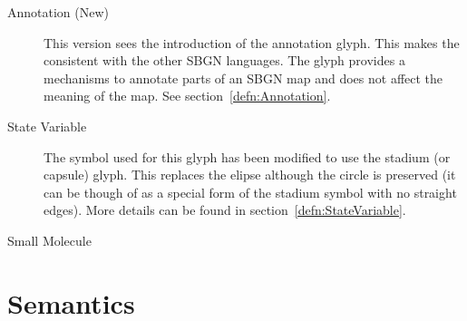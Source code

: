 \begin{description}
\item[Annotation (New)] This version sees the introduction of the annotation glyph. This makes the \PDl consistent with the other SBGN languages. The glyph provides a mechanisms to annotate parts of an SBGN map and does not affect the meaning of the map. See section~\ref{defn:Annotation}.
\item[State Variable] The symbol used for this glyph has been modified to use the stadium (or capsule) glyph. This replaces the elipse although the circle is preserved (it can be though of as a special form of the stadium symbol with no straight edges). More details can be found in section~\ref{defn:StateVariable}.
\item[Small Molecule] 
\end{description}

\section{Semantics}

